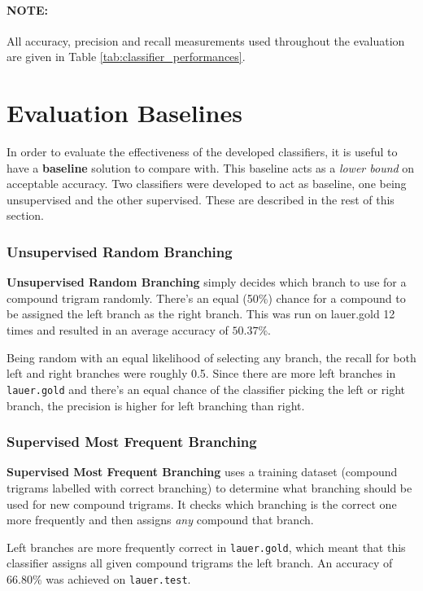 \documentclass{article}
\begin{document}
\paragraph{\textbf{NOTE}:} All accuracy, precision and recall measurements used throughout the evaluation are given in Table \ref{tab:classifier_performances}.

\section{Evaluation Baselines}

In order to evaluate the effectiveness of the developed classifiers, it is useful to have a \textbf{baseline} solution to compare with. This baseline acts as a \textit{lower bound} on acceptable accuracy. Two classifiers were developed to act as baseline, one being unsupervised and the other supervised. These are described in the rest of this section.

\subsubsection{Unsupervised Random Branching}
\label{sec:unsupervised_baseline} 

\textbf{Unsupervised Random Branching} simply decides which branch to use for a compound trigram randomly. There's an equal (50\%) chance for a compound to be assigned the left branch as the right branch. This was run on lauer.gold 12 times and resulted in an average accuracy of $50.37\%$.

Being random with an equal likelihood of selecting any branch, the recall for both left and right branches were roughly 0.5. Since there are more left branches in \texttt{lauer.gold} and there's an equal chance of the classifier picking the left or right branch, the precision is higher for left branching than right.

\subsubsection{Supervised Most Frequent Branching}
\label{sec:supervised_baseline} 

\textbf{Supervised Most Frequent Branching} uses a training dataset (compound trigrams labelled with correct branching) to determine what branching should be used for new compound trigrams. It checks which branching is the correct one more frequently and then assigns \textit{any} compound that branch.

Left branches are more frequently correct in \texttt{lauer.gold}, which meant that this classifier assigns all given compound trigrams the left branch. An accuracy of $66.80\%$ was achieved on \texttt{lauer.test}.
\end{document}
